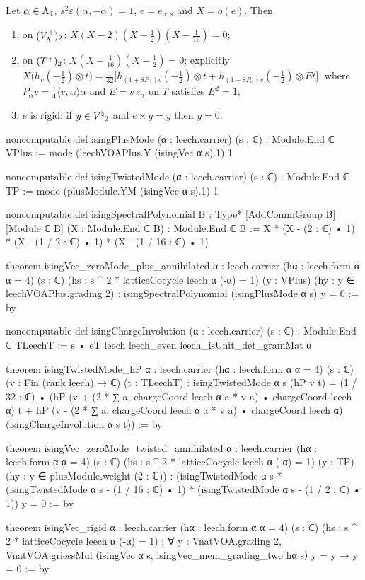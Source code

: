 \begin{theorem}\label{ch20:thm:rigid}
Let $\alpha\in{\Lambda}_4$, $s^2\varepsilon(\alpha,-\alpha)=1$, $e=e_{\alpha,s}$ and $X=o(e)$.  Then
\begin{enumerate}[label=(\alph*)]
\item on $(V_{\Lambda}^{+})_2$: $X(X-2)(X-\tfrac12)(X-\tfrac1{16})=0$;
\item on $(T^{+})_2$: $X(X-\tfrac1{16})(X-\tfrac12)=0$; explicitly
  $X\bigl(h_v(-\tfrac12)\otimes t\bigr)=\tfrac1{32}\bigl[h_{(1+8P_\alpha)v}(-\tfrac12)\otimes t+h_{(1-8P_\alpha)v}(-\tfrac12)\otimes
  Et\bigr]$, where $P_\alpha v=\tfrac14\langle v,\alpha\rangle\alpha$ and $E=s\,e_\alpha$ on $T$ satisfies $E^2=1$;
\item $e$ is rigid: if $y\in{V^{\natural}}_2$ and $e\times y=y$ then $y=0$.
\end{enumerate}
\end{theorem}
\begin{leancode}
noncomputable def isingPlusMode (α : leech.carrier) (s : ℂ) : Module.End ℂ VPlus :=
  mode (leechVOAPlus.Y (isingVec α s).1) 1

noncomputable def isingTwistedMode (α : leech.carrier) (s : ℂ) : Module.End ℂ TP :=
  mode (plusModule.YM (isingVec α s).1) 1

noncomputable def isingSpectralPolynomial {B : Type*} [AddCommGroup B] [Module ℂ B]
    (X : Module.End ℂ B) : Module.End ℂ B :=
  X * (X - (2 : ℂ) • 1) * (X - (1 / 2 : ℂ) • 1) * (X - (1 / 16 : ℂ) • 1)

theorem isingVec_zeroMode_plus_annihilated {α : leech.carrier}
    (hα : leech.form α α = 4) (s : ℂ)
    (hs : s ^ 2 * latticeCocycle leech α (-α) = 1)
    (y : VPlus) (hy : y ∈ leechVOAPlus.grading 2) :
    isingSpectralPolynomial (isingPlusMode α s) y = 0 := by

noncomputable def isingChargeInvolution (α : leech.carrier) (s : ℂ) :
    Module.End ℂ TLeechT := s • eT leech leech_even leech_isUnit_det_gramMat α

theorem isingTwistedMode_hP {α : leech.carrier} (hα : leech.form α α = 4)
    (s : ℂ) (v : Fin (rank leech) → ℂ) (t : TLeechT) :
    isingTwistedMode α s (hP v t) = (1 / 32 : ℂ) •
      (hP (v + (2 * ∑ a, chargeCoord leech α a * v a) • chargeCoord leech α) t +
        hP (v - (2 * ∑ a, chargeCoord leech α a * v a) • chargeCoord leech α)
          (isingChargeInvolution α s t)) := by

theorem isingVec_zeroMode_twisted_annihilated {α : leech.carrier}
    (hα : leech.form α α = 4) (s : ℂ)
    (hs : s ^ 2 * latticeCocycle leech α (-α) = 1)
    (y : TP) (hy : y ∈ plusModule.weight (2 : ℂ)) :
    (isingTwistedMode α s * (isingTwistedMode α s - (1 / 16 : ℂ) • 1) *
      (isingTwistedMode α s - (1 / 2 : ℂ) • 1)) y = 0 := by

theorem isingVec_rigid {α : leech.carrier} (hα : leech.form α α = 4) (s : ℂ)
    (hs : s ^ 2 * latticeCocycle leech α (-α) = 1) :
    ∀ y : VnatVOA.grading 2,
      VnatVOA.griessMul ⟨isingVec α s, isingVec_mem_grading_two hα s⟩ y = y → y = 0 := by
\end{leancode}
